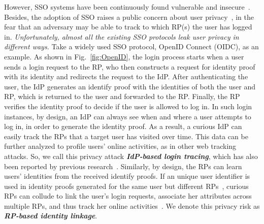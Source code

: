 However, SSO systems have been continuously found vulnerable and insecure~\cite{WangCW12,ccsSunB12,SomorovskyMSKJ12,ArmandoCCCPS13,DiscoveringJCS,dimvaLiM16,WangZLG16,MainkaMS16, MainkaMSW17,YangLCZ18}. Besides, the adoption of SSO raises a public concern about user privacy~\cite{maler2008venn,NIST2017draft,BrowserID,SPRESSO}, in the fear that an adversary may be able to track to which RP(s) the user has logged in. {\em Unfortunately, almost all the existing SSO protocols leak user privacy in different ways.} Take a widely used SSO protocol, OpenID Connect (OIDC), as an example. As shown in Fig.~\ref{fig:OpenID}, the login process starts when a user sends a login request to the RP, %
who then constructs a request for identity proof with its identity and redirects the request to the IdP. %
After authenticating the user, the IdP generates an identify proof with the identities of both the user and RP, %
which is returned to the user and forwarded to the RP. %
Finally, the RP verifies the identity proof to decide if the user is allowed to log in. In such login instances, by design, an IdP can always see when and where a user attempts to log in, in order to generate the identity proof. As a result, a curious IdP can easily track the RPs that a target user has visited over time. This data can be further analyzed to profile users' online activities, as in other web tracking attacks. So, we call this privacy attack \textbf{\em IdP-based login tracing}, which has also been reported by previous research~\cite{BrowserID,SPRESSO}. Similarly, by design, the RPs can learn users' identities from the received identify proofs. If an unique user identifier is used in identity proofs generated for the same user but different RPs~\cite{Google, FirefoxAccount}, curious RPs can collude to link the user's login requests, associate her attributes across multiple RPs, and thus track her online activities~\cite{maler2008venn}. We denote this privacy risk as \textbf{\em RP-based identity linkage}.

